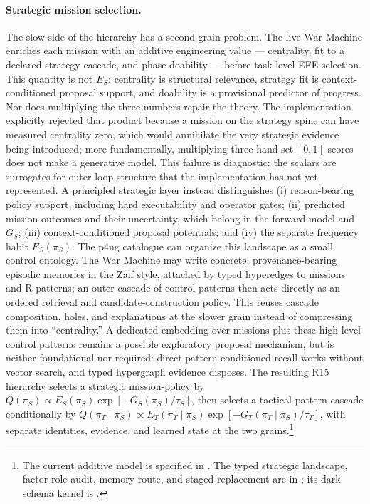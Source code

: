\paragraph{Strategic mission selection.} The slow side of the hierarchy has a second grain problem.  The live War Machine enriches each mission with an additive engineering value --- centrality, fit to a declared strategy cascade, and phase doability --- before task-level EFE selection.  This quantity is not $E_S$: centrality is structural relevance, strategy fit is context-conditioned proposal support, and doability is a provisional predictor of progress.  Nor does multiplying the three numbers repair the theory.  The implementation explicitly rejected that product because a mission on the strategy spine can have measured centrality zero, which would annihilate the very strategic evidence being introduced; more fundamentally, multiplying three hand-set $[0,1]$ scores does not make a generative model.  This failure is diagnostic: the scalars are surrogates for outer-loop structure that the implementation has not yet represented.  A principled strategic layer instead distinguishes (i) reason-bearing policy support, including hard executability and operator gates; (ii) predicted mission outcomes and their uncertainty, which belong in the forward model and $G_S$; (iii) context-conditioned proposal potentials; and (iv) the separate frequency habit $E_S(\pi_S)$.  The p4ng catalogue can organize this landscape as a small control ontology.  The War Machine may write concrete, provenance-bearing episodic memories in the Zaif style, attached by typed hyperedges to missions and R-patterns; an outer cascade of control patterns then acts directly as an ordered retrieval and candidate-construction policy.  This reuses cascade composition, holes, and explanations at the slower grain instead of compressing them into ``centrality.''  A dedicated embedding over missions plus these high-level control patterns remains a possible exploratory proposal mechanism, but is neither foundational nor required: direct pattern-conditioned recall works without vector search, and typed hypergraph evidence disposes.  The resulting R15 hierarchy selects a strategic mission-policy by $Q(\pi_S)\propto E_S(\pi_S)\exp[-G_S(\pi_S)/\tau_S]$, then selects a tactical pattern cascade conditionally by $Q(\pi_T\mid\pi_S)\propto E_T(\pi_T\mid\pi_S)\exp[-G_T(\pi_T\mid\pi_S)/\tau_T]$, with separate identities, evidence, and learned state at the two grains.\footnote{The current additive model is specified in .  The typed strategic landscape, factor-role audit, memory route, and staged replacement are in ; its dark schema kernel is .}

